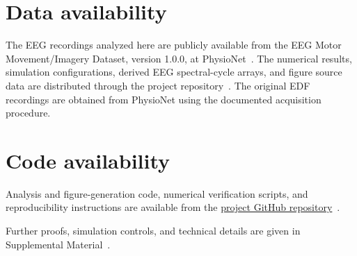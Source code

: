 \documentclass[aps,pre,reprint,amsmath,amssymb,superscriptaddress]{revtex4-2}
\begin{document}
\section*{Data availability}
The EEG recordings analyzed here are publicly available from the EEG Motor Movement/Imagery Dataset, version 1.0.0, at PhysioNet~\cite{schalk2009}. The numerical results, simulation configurations, derived EEG spectral-cycle arrays, and figure source data are distributed through the project repository~\cite{zhao2026repository}. The original EDF recordings are obtained from PhysioNet using the documented acquisition procedure.

\section*{Code availability}
Analysis and figure-generation code, numerical verification scripts, and reproducibility instructions are available from the \href{https://github.com/JustinZHAO-05/observation-architecture-temporal-irreversibility}{project GitHub repository}~\cite{zhao2026repository}.

\noindent Further proofs, simulation controls, and technical details are given in Supplemental Material~\cite{suppinfo}.

\appendix



\nocite{boumal2016,litam1994,schalk2004,oszmaniec2024,brinkerink2016,lachaume2013,ephremidze2007,ephremidze2014}


\end{document}
